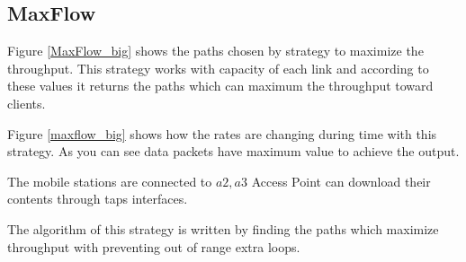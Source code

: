 











\subsection{MaxFlow}
Figure \ref{MaxFlow_big} shows the paths chosen by strategy to maximize the throughput. This strategy works with capacity of each link and according to these values it returns the paths which can maximum the throughput toward clients.

Figure \ref{maxflow_big} shows how the rates are changing during time with this strategy. As you can see data packets have maximum value to achieve the output.  

The mobile stations are connected to $a2,a3$ Access Point can download their contents through taps interfaces.

The algorithm of this strategy is written by finding the paths which maximize throughput with preventing out of range extra loops.

